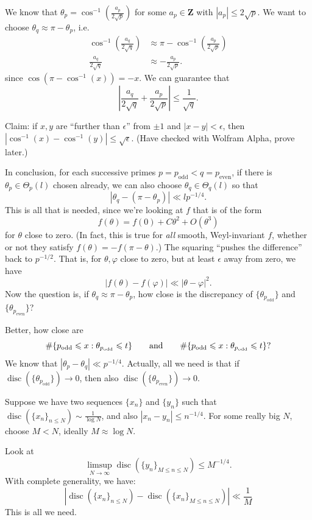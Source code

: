 \documentclass{article}
\DeclareMathOperator{\disc}{disc}
\newcommand{\bZ}{\mathbf{Z}}
\newcommand{\even}{\mathrm{even}}
\newcommand{\odd}{\mathrm{odd}}
\begin{document}
We know that $\theta_p = \cos^{-1}\left(\frac{a_p}{2\sqrt p}\right)$ for 
some $a_p\in \bZ$ with $|a_p| \leqslant 2\sqrt p$. We want to choose 
$\theta_q\approx \pi-\theta_p$, i.e.~
\begin{align*}
	\cos^{-1}\left(\frac{a_q}{2\sqrt q}\right) 
		&\approx \pi - \cos^{-1}\left(\frac{a_p}{2\sqrt p}\right) \\
	\frac{a_q}{2\sqrt q} 
		&\approx -\frac{a_p}{2\sqrt p} .
\end{align*}
since $\cos(\pi - \cos^{-1}(x)) = - x$. We can guarantee that 
\[
	\left|\frac{a_q}{2\sqrt q} + \frac{a_p}{2\sqrt p}\right| \leqslant \frac{1}{\sqrt q} .
\]

Claim: if $x,y$ are ``further than $\epsilon$'' from $\pm 1$ and 
$|x-y|<\epsilon$, then 
$|\cos^{-1}(x) - \cos^{-1}(y)| \leqslant \sqrt \epsilon$. 
(Have checked with Wolfram Alpha, prove later.)

In conclusion, for each successive primes $p=p_\odd < q=p_\even$, if there 
is $\theta_p\in \Theta_p(l)$ chosen already, we can also choose 
$\theta_q\in \Theta_q(l)$ so that 
\[
	|\theta_q - (\pi - \theta_p)| \ll l p^{-1/4} .
\]
This is all that is needed, since we're looking at $f$ that is of the form 
\[
	f(\theta) = f(0) + C \theta^2 + O(\theta^3)
\]
for $\theta$ close to zero. (In fact, this is true for \emph{all} smooth, 
Weyl-invariant $f$, whether or not they satisfy $f(\theta) = -f(\pi-\theta)$.)
The squaring ``pushes the difference'' back to 
$p^{-1/2}$. That is, for $\theta,\varphi$ close to zero, but at least 
$\epsilon$ away from zero, we have 
\[
	|f(\theta) - f(\varphi)| \ll |\theta-\varphi|^2 .
\]
Now the question is, if $\theta_q \approx \pi - \theta_p$, how close is the 
discrepancy of $\{\theta_{p_\odd}\}$ and $\{\theta_{p_\even}\}$?

Better, how close are 
\[
	\# \{p_\odd \leqslant x : \theta_{p_\odd} \leqslant t\} \qquad \textnormal{and}\qquad \# \{p_\odd \leqslant x : \theta_{p_\odd} \leqslant t\} ?
\]
We know that $|\theta_p - \theta_q| \ll p^{-1/4}$. Actually, all we need is 
that if $\disc(\{\theta_{p_\odd}\}) \to 0$, then also 
$\disc(\{\theta_{p_\even}\}) \to 0$. 

Suppose we have two sequences $\{x_n\}$ and $\{y_n\}$ such that  
$\disc(\{x_n\}_{n\leqslant N}) \sim \frac{1}{\log N}$, and also 
$|x_n - y_n| \leqslant n^{-1/4}$. For some really big $N$, choose 
$M<N$, ideally $M\approx \log N$. 

Look at 
\[
	\limsup_{N\to \infty} \disc(\{y_n\}_{M\leqslant n \leqslant N}) \leqslant M^{-1/4} .
\]
With complete generality, we have:
\[
	\left|\disc(\{x_n\}_{n\leqslant N}) - \disc(\{x_n\}_{M\leqslant n\leqslant N})\right| \ll \frac{1}{M}
\]
This is all we need.
\end{document}
